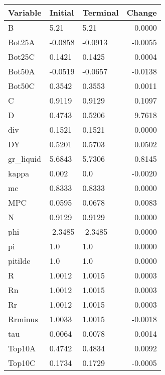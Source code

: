 \begin{table}
\centering
\label{tab:stst_comparison_fast_shock_wedge_permanent_asymmetric}
\begin{tabular}{lllr}
\toprule
                Variable & Initial & Terminal &  Change \\
\midrule
                       B &    5.21 &     5.21 &  0.0000 \\
                  Bot25A & -0.0858 &  -0.0913 & -0.0055 \\
                  Bot25C &  0.1421 &   0.1425 &  0.0004 \\
                  Bot50A & -0.0519 &  -0.0657 & -0.0138 \\
                  Bot50C &  0.3542 &   0.3553 &  0.0011 \\
                       C &  0.9119 &   0.9129 &  0.1097 \\
                       D &  0.4743 &   0.5206 &  9.7618 \\
                     div &  0.1521 &   0.1521 &  0.0000 \\
                      DY &  0.5201 &   0.5703 &  0.0502 \\
               gr\_liquid &  5.6843 &   5.7306 &  0.8145 \\
                   kappa &   0.002 &      0.0 & -0.0020 \\
                      mc &  0.8333 &   0.8333 &  0.0000 \\
                     MPC &  0.0595 &   0.0678 &  0.0083 \\
                       N &  0.9129 &   0.9129 &  0.0000 \\
                     phi & -2.3485 &  -2.3485 &  0.0000 \\
                      pi &     1.0 &      1.0 &  0.0000 \\
                 pitilde &     1.0 &      1.0 &  0.0000 \\
                       R &  1.0012 &   1.0015 &  0.0003 \\
                      Rn &  1.0012 &   1.0015 &  0.0003 \\
                      Rr &  1.0012 &   1.0015 &  0.0003 \\
                 Rrminus &  1.0033 &   1.0015 & -0.0018 \\
                     tau &  0.0064 &   0.0078 &  0.0014 \\
                  Top10A &  0.4742 &   0.4834 &  0.0092 \\
                  Top10C &  0.1734 &   0.1729 & -0.0005 \\

\end{tabular}
\end{table}
